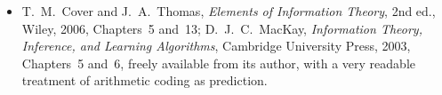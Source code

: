 \begin{itemize}
\item T.~M.~Cover and J.~A.~Thomas, \emph{Elements of Information Theory}, 2nd ed., Wiley, 2006, Chapters~5 and~13; D.~J.~C.~MacKay, \emph{Information Theory, Inference, and Learning Algorithms}, Cambridge University Press, 2003, Chapters~5 and~6, freely available from its author, with a very readable treatment of arithmetic coding as prediction.
\end{itemize}
